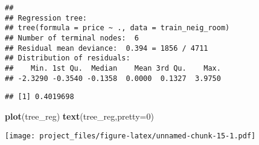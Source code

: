 \documentclass[
]{article}
\newenvironment{Shaded}{\begin{snugshade}}{\end{snugshade}}
\newcommand{\CommentTok}[1]{\textcolor[rgb]{0.56,0.35,0.01}{\textit{#1}}}
\newcommand{\DataTypeTok}[1]{\textcolor[rgb]{0.13,0.29,0.53}{#1}}
\newcommand{\DecValTok}[1]{\textcolor[rgb]{0.00,0.00,0.81}{#1}}
\newcommand{\FloatTok}[1]{\textcolor[rgb]{0.00,0.00,0.81}{#1}}
\newcommand{\KeywordTok}[1]{\textcolor[rgb]{0.13,0.29,0.53}{\textbf{#1}}}
\newcommand{\NormalTok}[1]{#1}
\newcommand{\OperatorTok}[1]{\textcolor[rgb]{0.81,0.36,0.00}{\textbf{#1}}}
\newcommand{\StringTok}[1]{\textcolor[rgb]{0.31,0.60,0.02}{#1}}
\begin{document}
\begin{verbatim}
## 
## Regression tree:
## tree(formula = price ~ ., data = train_neig_room)
## Number of terminal nodes:  6 
## Residual mean deviance:  0.394 = 1856 / 4711 
## Distribution of residuals:
##    Min. 1st Qu.  Median    Mean 3rd Qu.    Max. 
## -2.3290 -0.3540 -0.1358  0.0000  0.1327  3.9750
\end{verbatim}

\begin{Shaded}
\end{Shaded}

\begin{verbatim}
## [1] 0.4019698
\end{verbatim}

\begin{Shaded}
\begin{Highlighting}[]
\KeywordTok{plot}\NormalTok{(tree_reg)}
\KeywordTok{text}\NormalTok{(tree_reg,}\DataTypeTok{pretty=}\DecValTok{0}\NormalTok{)}
\end{Highlighting}
\end{Shaded}

\texttt{[image: project\_files/figure-latex/unnamed-chunk-15-1.pdf]}

\begin{Shaded}
\end{Shaded}
\end{document}
